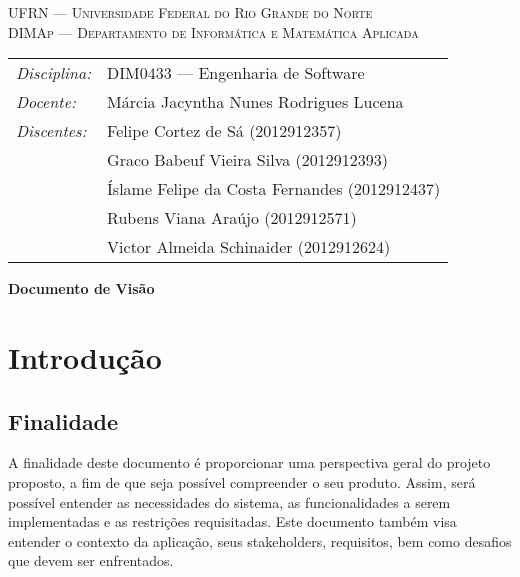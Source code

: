 \documentclass[12pt, a4paper]{article}
\begin{document}
    \begin{titlepage}
        \huge
    \end{titlepage}

    \begin{center}
      \textsc{UFRN --- Universidade Federal do Rio Grande do Norte} \\
      \textsc{DIMAp --- Departamento de Informática e Matemática Aplicada} \\
    \end{center}

    \bigskip

    \begin{tabular}{@{}ll@{}}
        \emph{Disciplina:} & DIM0433 --- Engenharia de Software \\
        \emph{Docente:}    & Márcia Jacyntha Nunes Rodrigues Lucena \\
        \emph{Discentes:}  & Felipe Cortez de Sá \small{(2012912357)} \\
                           & Graco Babeuf Vieira Silva \small{(2012912393)} \\
                           & Íslame Felipe da Costa Fernandes \small{(2012912437)} \\
                           & Rubens Viana Araújo \small{(2012912571)} \\
                           & Victor Almeida Schinaider \small{(2012912624)}
    \end{tabular}

    \bigskip

    \begin{center}
      \Large\textbf{Documento de Visão}
    \end{center}

    \section{Introdução}
        \subsection{Finalidade}
        A finalidade deste documento é proporcionar uma perspectiva geral do
        projeto proposto, a fim de que seja possível compreender o seu produto.
        Assim, será possível entender as necessidades do sistema, as
        funcionalidades a serem implementadas e as restrições requisitadas.
        Este documento também visa entender o contexto da aplicação, seus
        stakeholders, requisitos, bem como desafios que devem ser enfrentados.
\end{document}
